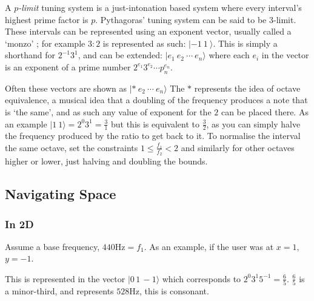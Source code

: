 A \emph{$p$-limit} tuning system is a just-intonation based system where every
interval's highest prime factor is $p$. \citep[p.76, 109]{partch1974genesis}
Pythagoras' tuning system can be said to be 3-limit. These intervals can be
represented using an exponent vector, usually called a `monzo'
\citep{monzo_2005}; for example $3:2$ is represented as such: $|-1\ 1\ \rangle$.
This is simply a shorthand for $2^{-1} 3^1$, and can be extended: $|e_1\ e_2\
\cdots\ e_n\rangle$ where each $e_i$ in the vector is an exponent of a prime
number $2^{e_1} 3^{e_2} \cdots p_n^{e_n}$. 

Often these vectors are shown as $|*\ e_2\ \cdots\ e_n \rangle$ The $*$ represents the idea
of octave equivalence, a musical idea that a doubling of the frequency produces
a note that is `the same', and as such any value of exponent for the $2$ can be
placed there. As an example $|1\ 1\rangle = 2^0 3^1 = \frac{3}{1}$ but this is
equivalent to $\frac{3}{2}$, as you can simply halve the frequency produced by
the ratio to get back to it. To normalise the interval the same octave, set the
constraints $1 \leq \frac{f_1}{f_2} < 2$ and similarly for other octaves higher
or lower, just halving and doubling the bounds.

\subsection{Navigating Space}
\subsubsection{In 2D}
Assume a base frequency, $440\si{\hertz} = f_1$. As an example, if the user was
at $x=1$, $y=-1$.

\begin{figure}[H]
    \centering
    \caption{}
\end{figure}

This is represented in the vector $|0\, 1\, -1\rangle$ which corresponds to $2^0
3^1 5^{-1} = \frac{6}{5}$. $\frac{6}{5}$ is a minor-third, and represents
$528\si{\hertz}$, this is consonant.

